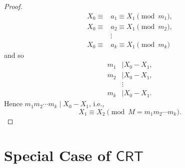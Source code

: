 \documentclass{article}
\newcommand{\ie}{\textnormal{i.e.}}
\theoremstyle{definition}
\begin{document}
\begin{proof}
\begin{align*}
		X_0\equiv &a_1\equiv X_1\pmod{m_1},\\
		X_0\equiv &a_2\equiv X_1\pmod{m_2},\\
		&\vdots\\
		X_0\equiv &a_k\equiv X_1\pmod{m_k}
		\end{align*} and so \begin{align*}
		m_1&\mid X_0-X_1,\\
		m_2&\mid X_0-X_1,\\
		&\vdots\\
		m_k&\mid X_0-X_1.
		\end{align*} Hence $m_1m_2\cdots m_k\mid X_0-X_1$, \ie, \[
		X_1\equiv X_2\pmod{M=m_1m_2\cdots m_k}.
		\]
	\end{proof}
	\newpage
	
	\section{Special Case of $\mathsf{CRT}$}
	
\end{document}
